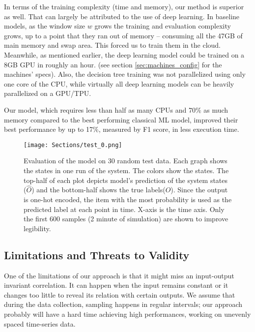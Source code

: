 In terms of the training complexity (time and memory), our method is superior as well. That can largely be attributed to the use of deep learning. In baseline models, as the window size $w$ grows the training and evaluation complexity grows, up to a point that they ran out of memory -- consuming all the 47GB of main memory and swap area. This forced us to train them in the cloud. Meanwhile, as mentioned earlier, the deep learning model could be trained on a 8GB GPU in roughly an hour. (see section \ref{sec:machines_config} for the machines' specs). Also, the decision tree training was not parallelized using only one core of the CPU, while virtually all deep learning models can be heavily parallelized on a GPU/TPU. %

\begin{rqanswer}
Our model, which requires less than half as many CPUs and 70\% as much memory compared to the best performing classical ML model, improved their best performance by up to 17\%, measured by F1 score, in less execution time.
\end{rqanswer}


\begin{figure*}
    \centering
    \texttt{[image: Sections/test\_0.png]}
    \caption{Evaluation of the model on 30 random test data. Each graph shows the states in one run of the system. The colors show the states. The top-half of each plot depicts model's prediction of the system states ($\hat{O}$) and the bottom-half shows the true labels($O$). Since the output is one-hot encoded, the item with the most probability is used as the predicted label at each point in time. X-axis is the time axis. Only the first 600 samples (2 minute of simulation) are shown to improve legibility.}
    \label{fig:test_0}
\end{figure*}




\subsection{Limitations and Threats to Validity} \label{sec:threats_to_validity}
One of the limitations of our approach is that it might miss an input-output invariant correlation. It can happen when the input remains constant or it changes too little to reveal its relation with certain outputs. 
We assume that during the data collection, sampling happens in regular intervals; our approach probably will have a hard time achieving high performances, working on unevenly spaced time-series data.

